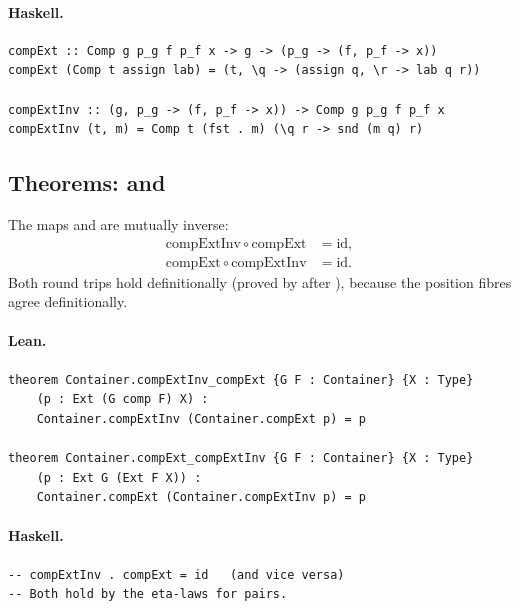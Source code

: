 \documentclass[11pt,a4paper]{article}
\begin{document}
\paragraph{Haskell.}
\begin{lstlisting}[style=haskell]
compExt :: Comp g p_g f p_f x -> g -> (p_g -> (f, p_f -> x))
compExt (Comp t assign lab) = (t, \q -> (assign q, \r -> lab q r))

compExtInv :: (g, p_g -> (f, p_f -> x)) -> Comp g p_g f p_f x
compExtInv (t, m) = Comp t (fst . m) (\q r -> snd (m q) r)
\end{lstlisting}


\subsection{Theorems:  and }

\begin{thm}
The maps  and  are mutually inverse:
\begin{align*}
  \mathrm{compExtInv} \circ \mathrm{compExt} &= \mathrm{id}, \\
  \mathrm{compExt} \circ \mathrm{compExtInv} &= \mathrm{id}.
\end{align*}
Both round trips hold definitionally (proved by  after
), because the position fibres agree definitionally.
\end{thm}

\paragraph{Lean.}
\begin{lstlisting}[style=lean]
theorem Container.compExtInv_compExt {G F : Container} {X : Type}
    (p : Ext (G comp F) X) :
    Container.compExtInv (Container.compExt p) = p

theorem Container.compExt_compExtInv {G F : Container} {X : Type}
    (p : Ext G (Ext F X)) :
    Container.compExt (Container.compExtInv p) = p
\end{lstlisting}

\paragraph{Haskell.}
\begin{lstlisting}[style=haskell]
-- compExtInv . compExt = id   (and vice versa)
-- Both hold by the eta-laws for pairs.
\end{lstlisting}
\end{document}
